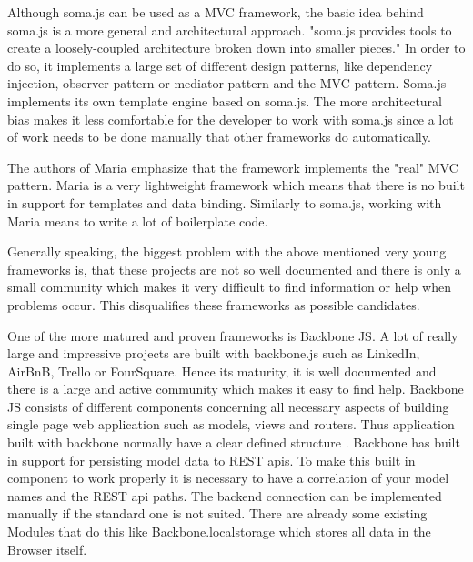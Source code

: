 Although soma.js can be used as a MVC framework, the basic idea behind soma.js is a more general and architectural approach.
"soma.js  provides tools to create a loosely-coupled architecture broken down into smaller pieces." \autocite{tech-ana:somaJS}  In order to do so, it implements a large set of different design patterns, like dependency injection, observer pattern or mediator pattern and the MVC pattern.
Soma.js implements its own template engine based on soma.js.
The more architectural bias makes it less comfortable for the developer to work with soma.js since a lot of work needs to be done manually that other frameworks do automatically.

The authors of Maria emphasize that the framework implements the "real" MVC pattern.
Maria is a very lightweight framework which means that there is no built in support for templates and data binding.
Similarly to soma.js, working with Maria means to write a lot of boilerplate code.

Generally speaking, the biggest problem with the above mentioned very young frameworks is, that these projects are not so well documented and there is only a small community which makes it very difficult to find information or help when problems occur.
This disqualifies these frameworks as possible candidates.

One of the more matured and proven frameworks is Backbone JS.
A lot of really large and impressive projects are built with backbone.js such as LinkedIn, AirBnB, Trello or FourSquare.
Hence its maturity, it is well documented and there is a large and active community which makes it easy to find help.
Backbone JS  consists of different components concerning all necessary aspects of building single page web application such as models, views and routers.
Thus application built with backbone normally have a clear defined structure \autocite{tech-ana:heise-backbone}.
Backbone has built in support for persisting model data to REST apis. 
To make this built in component to work properly it is necessary to have a correlation of your model names and the REST api paths.
The backend connection can be implemented manually if the standard one is not suited.
There are already some existing Modules that do this like Backbone.localstorage which stores all data in the Browser itself. 

